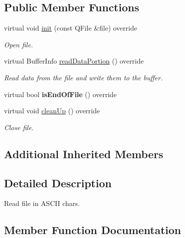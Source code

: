\subsection*{Public Member Functions}
\begin{DoxyCompactItemize}
\item 
virtual void \hyperlink{classAsciiTransmissionReader_ab0c198c17eded2a978d974c01aebae37}{init} (const Q\+File \&file) override
\begin{DoxyCompactList}\small\item\em Open file. \end{DoxyCompactList}\item 
virtual Buffer\+Info \hyperlink{classAsciiTransmissionReader_a5fd477415e273e4943caac08e8b0a7e5}{read\+Data\+Portion} () override
\begin{DoxyCompactList}\small\item\em Read data from the file and write them to the buffer. \end{DoxyCompactList}\item 
\mbox{\label{classAsciiTransmissionReader_abfbbb093791319058a769845934b9ecd}} 
virtual bool {\bfseries is\+End\+Of\+File} () override
\item 
\mbox{\label{classAsciiTransmissionReader_a42e738fa2ccdf476d916e47c8fdbbecf}} 
virtual void \hyperlink{classAsciiTransmissionReader_a42e738fa2ccdf476d916e47c8fdbbecf}{clean\+Up} () override
\begin{DoxyCompactList}\small\item\em Close file. \end{DoxyCompactList}\end{DoxyCompactItemize}
\subsection*{Additional Inherited Members}


\subsection{Detailed Description}
Read file in A\+S\+C\+II chars. 

\subsection{Member Function Documentation}
\mbox{\label{classAsciiTransmissionReader_ab0c198c17eded2a978d974c01aebae37}} 
